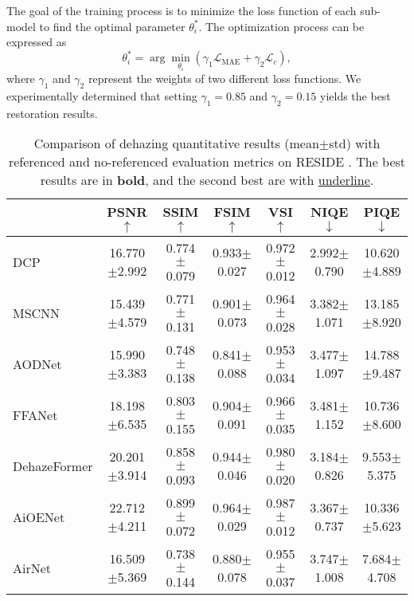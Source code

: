 \documentclass[final,12pt]{elsarticle}
\begin{document}
    The goal of the training process is to minimize the loss function of each sub-model to find the optimal parameter $\theta_i^*$. The optimization process can be expressed as
    \begin{equation}
        \theta_i^*=\arg \min _{\theta_i} (\gamma_1\mathcal{L}_{\text{MAE}} + \gamma_2\mathcal{L}_{c}),
    \end{equation}
    where $\gamma_1$ and $\gamma_2$ represent the weights of two different loss functions. We experimentally determined that setting $\gamma_1 = 0.85$ and $\gamma_2 = 0.15$ yields the best restoration results.
% 
    \setlength{\tabcolsep}{0.50pt}
    \begin{table}[t]
        \centering
        \scriptsize
        \caption{Comparison of dehazing quantitative results (mean$\pm$std) with referenced and no-referenced evaluation metrics on RESIDE \citep{li2018benchmarking}. The best results are in \textbf{bold}, and the second best are with \underline{underline}.}
        \begin{tabular}{l|cccc|cc}
        \hline
        & PSNR $\uparrow$ & SSIM $\uparrow$ & FSIM $\uparrow$ & VSI $\uparrow$ & NIQE $\downarrow$ & PIQE $\downarrow$ \\ \hline\hline
        DCP \citep{he2010single}          & 16.770$\pm$2.992 & 0.774$\pm$0.079 & 0.933$\pm$0.027 & 0.972$\pm$0.012 & 2.992$\pm$0.790 & 10.620$\pm$4.889 \\ 
        MSCNN \citep{ren2016single}        & 15.439$\pm$4.579 & 0.771$\pm$0.131 & 0.901$\pm$0.073 & 0.964$\pm$0.028 & 3.382$\pm$1.071 & 13.185$\pm$8.920 \\ 
        AODNet \citep{li2017aod}       & 15.990$\pm$3.383 & 0.748$\pm$0.138 & 0.841$\pm$0.088 & 0.953$\pm$0.034 & 3.477$\pm$1.097 & 14.788$\pm$9.487 \\ 
        FFANet \citep{qin2020ffa}       & 18.198$\pm$6.535 & 0.803$\pm$0.155 & 0.904$\pm$0.091 & 0.966$\pm$0.035 & 3.481$\pm$1.152 & 10.736$\pm$8.600 \\ 
        DehazeFormer \citep{song2023vision} & 20.201$\pm$3.914 & 0.858$\pm$0.093 & 0.944$\pm$0.046 & 0.980$\pm$0.020 & 3.184$\pm$0.826 & 9.553$\pm$5.375  \\ 
        AiOENet \citep{liu2023aioenet}      & 22.712$\pm$4.211 & 0.899$\pm$0.072 & 0.964$\pm$0.029 & 0.987$\pm$0.012 & 3.367$\pm$0.737 & 10.336$\pm$5.623 \\ 
        AirNet \citep{li2022all}       & 16.509$\pm$5.369 & 0.738$\pm$0.144 & 0.880$\pm$0.078 & 0.955$\pm$0.037 & 3.747$\pm$1.008 & 7.684$\pm$4.708  \\ 

\end{tabular}
\end{table}
\end{document}
